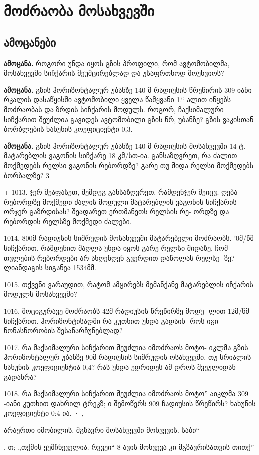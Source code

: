\documentclass[a4paper]{book}
\begin{document}
 
\section{მოძრაობა მოსახვევში}
\subsection{ამოცანები}
\textbf{ამოცანა.} როგორი უნდა იყოს გზის პროფილი, რომ ავტომობილმა, მოსახვევში სიჩქარის შეუმცირებლად და უსაფრთხოდ მოუხვიოს?

\textbf{ამოცანა.} გზის ჰორიზონტალურ უბანზე 140 მ რადიუსის წრეწირის 309-იანი რკალის დასაწყისში ავტომობილი ყველა წამყვანი 1.“
ალით იწყებს მოძრაობას და ზრდის სიჩქარის მოდულს. როგორ,
ჩაქსიმალური სიჩქარით შეუძლია გავიდეს ავტომობილი გზის წრ,
უბანზე? გზის ვაკისთან ბორბლების ხახუნის კოეფიციენტი 0,3.

\textbf{ამოცანა.} გზის ჰორიზონტალურ უბანზე 140 მ რადიუსის მოსახვევში 14 ტ. მატარებლის ვაგონის სიჩქარე 18 კმ/სთ-ია. განსაზღვრეთ, რა ძალით მოქმედებს რელსი ვაგონის რებორდზე? გარე თუ შიდა რელსი მოქმედებს ბორბალზე? 3

+ 1013. ჯერ შეაფასეთ, შემდეგ განსაზღვრეთ, რამდენჯერ შეიცვ.
ღება რებორდზე მოქმედი ძალის მოდული მატარებლის ვაგონის
სიჩქარის ორჯერ გაზრდისას? შეადარეთ ერთმანეთს რელსის რე-
ორდზე და რებორდის რელსზე მოქმედი ძალები.

1014. 800მ რადიუსის სიმრუდის მოსახვევში მატარებელი მოძრაობს.
'0მ/წმ სიჩქარით. რამდენით მაღლა უნდა იყოს გარე რელსი შიდაზე,
ჩომ თვლების რებორდები არ ახღენღენ გვერდით დაწოლას რელსე-
ზე? ლიანდაგის სიგანეა 1534მმ.

1015. თქვენი ვარაუდით, რატომ ამცირებს მემანქანე მატარებლის
იჩქარის მოდულს მოსახვევში?

1016. მოციგურავე მოძრაობს 42მ რადიუსის წრეწირზე მოდუ-
ლით 12მ/წმ სიჩქარით. ჰორიზონტისადმი რა კუთხით უნდა გადაიხ-
როს იგი წონასწორობის შესანარჩუნებლად?

1017. რა მაქსიმალური სიჩქარით შეუძლია იმოძრაოს მოტო-
იკლმა გზის ჰორიზონტალურ უბანზე 90მ რადიუსის სიმრუდის
ოსახვევში, თუ სრიალის ხახუნის კოეფიციენტია 0,4? რას უნდა
ედრიდეს ამ დროს შვეულიდან გადახრა?

1018. რა მაქსიმალური სიჩქარით შეუძლია იმოძრაოს მოტო”
აიკლმა 309 -იანი კუთხით დახრილ ტრეკზ; ი შემოწერს 909
ჩადიუსის წრეწირს? ხახუნის კოეფიციენტი  0:4-ია.  · ,

არაერთი იმობილის. მგზავრი მოსახვევში მოხვევის. საბი“

. თ; „თქმის
ეუმჩნეველია. რვვეი“ 8 ავის მოხვევა კი მგზავრისათვის თითქ”
\end{document}
